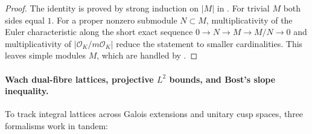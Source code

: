\begin{proof}
The identity is proved by strong induction on $|M|$ in
. For trivial $M$
both sides equal $1$. For a proper nonzero submodule $N \subset M$,
multiplicativity of the Euler characteristic along the short exact sequence
$0 \to N \to M \to M/N \to 0$ and multiplicativity of
$|\mathcal{O}_K / m \mathcal{O}_K|$ reduce the statement to smaller
cardinalities. This leaves simple modules $M$, which are handled by
.
\end{proof}

\paragraph{Wach dual-fibre lattices, projective $L^2$ bounds, and Bost's slope inequality.}
To track integral lattices across Galois extensions and unitary cusp spaces,
three formalisms work in tandem:
